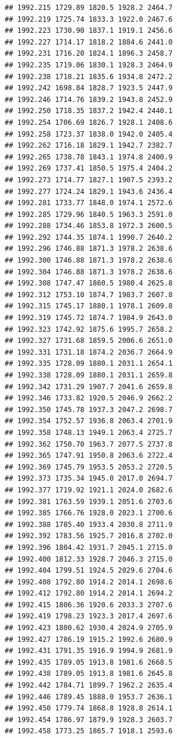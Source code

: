 \documentclass[
]{book}
\begin{document}
\begin{verbatim}
## 1992.215 1729.89 1820.5 1928.2 2464.7
## 1992.219 1725.74 1833.3 1922.0 2467.6
## 1992.223 1730.90 1837.1 1919.1 2456.6
## 1992.227 1714.17 1818.2 1884.6 2441.0
## 1992.231 1716.20 1824.1 1896.3 2458.7
## 1992.235 1719.06 1830.1 1928.3 2464.9
## 1992.238 1718.21 1835.6 1934.8 2472.2
## 1992.242 1698.84 1828.7 1923.5 2447.9
## 1992.246 1714.76 1839.2 1943.8 2452.9
## 1992.250 1718.35 1837.2 1942.4 2440.1
## 1992.254 1706.69 1826.7 1928.1 2408.6
## 1992.258 1723.37 1838.0 1942.0 2405.4
## 1992.262 1716.18 1829.1 1942.7 2382.7
## 1992.265 1738.78 1843.1 1974.8 2400.9
## 1992.269 1737.41 1850.5 1975.4 2404.2
## 1992.273 1714.77 1827.1 1907.5 2393.2
## 1992.277 1724.24 1829.1 1943.6 2436.4
## 1992.281 1733.77 1848.0 1974.1 2572.6
## 1992.285 1729.96 1840.5 1963.3 2591.0
## 1992.288 1734.46 1853.8 1972.3 2600.5
## 1992.292 1744.35 1874.1 1990.7 2640.2
## 1992.296 1746.88 1871.3 1978.2 2638.6
## 1992.300 1746.88 1871.3 1978.2 2638.6
## 1992.304 1746.88 1871.3 1978.2 2638.6
## 1992.308 1747.47 1860.5 1980.4 2625.8
## 1992.312 1753.10 1874.7 1983.7 2607.8
## 1992.315 1745.17 1880.1 1978.1 2609.8
## 1992.319 1745.72 1874.7 1984.9 2643.0
## 1992.323 1742.92 1875.6 1995.7 2658.2
## 1992.327 1731.68 1859.5 2006.6 2651.0
## 1992.331 1731.18 1874.2 2036.7 2664.9
## 1992.335 1728.09 1880.1 2031.1 2654.1
## 1992.338 1728.09 1880.1 2031.1 2659.8
## 1992.342 1731.29 1907.7 2041.6 2659.8
## 1992.346 1733.82 1920.5 2046.9 2662.2
## 1992.350 1745.78 1937.3 2047.2 2698.7
## 1992.354 1752.57 1936.8 2063.4 2701.9
## 1992.358 1748.13 1949.1 2063.4 2725.7
## 1992.362 1750.70 1963.7 2077.5 2737.8
## 1992.365 1747.91 1950.8 2063.6 2722.4
## 1992.369 1745.79 1953.5 2053.2 2720.5
## 1992.373 1735.34 1945.0 2017.0 2694.7
## 1992.377 1719.92 1921.1 2024.0 2682.6
## 1992.381 1763.59 1939.1 2051.6 2703.6
## 1992.385 1766.76 1928.0 2023.1 2700.6
## 1992.388 1785.40 1933.4 2030.8 2711.9
## 1992.392 1783.56 1925.7 2016.8 2702.0
## 1992.396 1804.42 1931.7 2045.1 2715.0
## 1992.400 1812.33 1928.7 2046.3 2715.0
## 1992.404 1799.51 1924.5 2029.6 2704.6
## 1992.408 1792.80 1914.2 2014.1 2698.6
## 1992.412 1792.80 1914.2 2014.1 2694.2
## 1992.415 1806.36 1920.6 2033.3 2707.6
## 1992.419 1798.23 1923.3 2017.4 2697.6
## 1992.423 1800.62 1930.4 2024.9 2705.9
## 1992.427 1786.19 1915.2 1992.6 2680.9
## 1992.431 1791.35 1916.9 1994.9 2681.9
## 1992.435 1789.05 1913.8 1981.6 2668.5
## 1992.438 1789.05 1913.8 1981.6 2645.8
## 1992.442 1784.71 1899.7 1962.2 2635.4
## 1992.446 1789.45 1888.0 1953.7 2636.1
## 1992.450 1779.74 1868.8 1928.8 2614.1
## 1992.454 1786.97 1879.9 1928.3 2603.7
## 1992.458 1773.25 1865.7 1918.1 2593.6

\end{verbatim}
\end{document}
